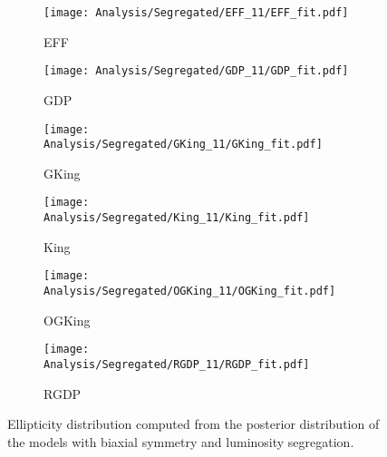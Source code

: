 \begin {figure}
\centering
\begin{subfigure}[t]{0.45\textwidth}
 \texttt{[image: Analysis/Segregated/EFF\_11/EFF\_fit.pdf]}
 \caption{EFF}  
    \end{subfigure}
    \begin{subfigure}[t]{0.45\textwidth}
 \texttt{[image: Analysis/Segregated/GDP\_11/GDP\_fit.pdf]}
 \caption{GDP}  
    \end{subfigure}
    \begin{subfigure}[t]{0.45\textwidth}
 \texttt{[image: Analysis/Segregated/GKing\_11/GKing\_fit.pdf]}
 \caption{GKing}  
    \end{subfigure}
    \begin{subfigure}[t]{0.45\textwidth}
 \texttt{[image: Analysis/Segregated/King\_11/King\_fit.pdf]}
 \caption{King}  
    \end{subfigure}
    \begin{subfigure}[t]{0.45\textwidth}
 \texttt{[image: Analysis/Segregated/OGKing\_11/OGKing\_fit.pdf]}
 \caption{OGKing}  
    \end{subfigure}
        \begin{subfigure}[t]{0.45\textwidth}
 \texttt{[image: Analysis/Segregated/RGDP\_11/RGDP\_fit.pdf]}
 \caption{RGDP}  
    \end{subfigure}
  \caption{Ellipticity distribution computed from the posterior distribution of the models with biaxial symmetry and luminosity segregation.}
\label{fig:EllipticitySeg}
\end {figure}








